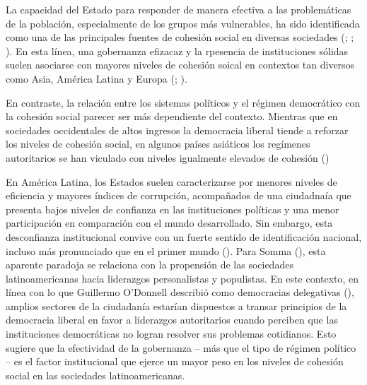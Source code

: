 \documentclass[
  letterpaper,
  DIV=11,
  numbers=noendperiod]{scrartcl}
\begin{document}
La capacidad del Estado para responder de manera efectiva a las
problemáticas de la población, especialmente de los grupos más
vulnerables, ha sido identificada como una de las principales fuentes de
cohesión social en diversas sociedades
(;
;
). En esta
línea, una gobernanza efizacaz y la rpesencia de instituciones sólidas
suelen asociarse con mayores niveles de cohesión soical en contextos tan
diversos como Asia, América Latina y Europa
(;
).

En contraste, la relación entre los sistemas políticos y el régimen
democrático con la cohesión social parecer ser más dependiente del
contexto. Mientras que en sociedades occidentales de altos ingresos la
democracia liberal tiende a reforzar los niveles de cohesión social, en
algunos países asiáticos los regímenes autoritarios se han viculado con
niveles igualmente elevados de cohesión
()

En América Latina, los Estados suelen caracterizarse por menores niveles
de eficiencia y mayores índices de corrupción, acompañados de una
ciudadnaía que presenta bajos niveles de confianza en las instituciones
políticas y una menor participación en comparación con el mundo
desarrollado. Sin embargo, esta desconfianza institucional convive con
un fuerte sentido de identificación nacional, incluso más pronunciado
que en el primer mundo (). Para Somma
(), esta aparente paradoja se
relaciona con la propensión de las sociedades latinoamericanas hacia
liderazgos personalistas y populistas. En este contexto, en línea con lo
que Guillermo O'Donnell describió como democracias delegativas
(), amplios sectores de
la ciudadanía estarían dispuestos a transar principios de la democracia
liberal en favor a liderazgos autoritarios cuando perciben que las
instituciones democráticas no logran resolver sus problemas cotidianos.
Esto sugiere que la efectividad de la gobernanza -- más que el tipo de
régimen político -- es el factor institucional que ejerce un mayor peso
en los niveles de cohesión social en las sociedades latinoamericanas.
\end{document}
